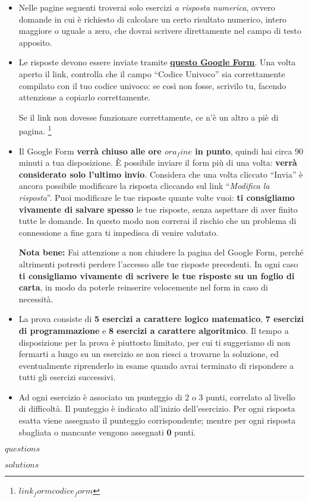 \documentclass[a4paper]{article}
\newcommand{\myul}[2][black]{\setulcolor{#1}\ul{\textbf{#2}}\setulcolor{black}}
\begin{document}
\begin{itemize}
    \item Nelle pagine seguenti troverai solo esercizi \emph{a risposta numerica},
          ovvero domande in cui è richiesto di calcolare un certo risultato
          numerico, intero maggiore o uguale a zero, che dovrai scrivere direttamente nel campo
          di testo apposito.

    \item Le risposte devono essere inviate tramite
          \href{${link_form}$${codice_form}$}{\color{blue}
          \myul[blue] {questo Google Form}}. Una volta aperto il link, controlla che
          il campo ``Codice Univoco'' sia correttamente compilato con il tuo codice
          univoco: se così non fosse, scrivilo tu,  facendo attenzione a copiarlo
          correttamente.

          Se il link non dovesse funzionare correttamente, ce n'è un altro a piè di pagina.%
          \footnote{\tiny\href{${link_form}$${codice_form}$}{\texttt{${link_form}$${codice_form}$}}}

    \item Il Google Form \textbf{verrà chiuso alle ore ${ora_fine}$ in punto}, quindi hai
          circa 90 minuti a tua disposizione. È possibile inviare il form più di una 
          volta: \textbf{verrà considerato solo l'ultimo invio}. Considera che una
          volta cliccato ``Invia'' è ancora possibile modificare la risposta cliccando
          sul link ``\emph{Modifica la risposta}''. Puoi modificare le tue risposte
          quante volte vuoi: \textbf{ti consigliamo vivamente di salvare spesso} le tue
          risposte, senza aspettare di aver finito tutte le domande. In questo modo non
          correrai il rischio che un problema di connessione a fine gara ti impedisca di
          venire valutato.

          \textbf{Nota bene:} Fai attenzione a non chiudere la pagina del Google Form,
          perché altrimenti potresti perdere l'accesso alle tue risposte precedenti.
          In ogni caso \textbf{ti consigliamo vivamente di scrivere le tue risposte su un
          foglio di carta}, in modo da poterle reinserire velocemente nel form in caso
          di necessità.

    \item La prova consiste di \textbf{5 esercizi a carattere logico
          matematico}, \textbf{7 esercizi di programmazione} e \textbf{8
          esercizi a carattere algoritmico}. Il tempo a disposizione per la
          prova è piuttosto limitato, per cui ti suggeriamo di non fermarti a lungo
          su un esercizio se non riesci a trovarne la soluzione, ed eventualmente
          riprenderlo in esame quando avrai terminato di rispondere a tutti gli esercizi
          successivi.

    \item Ad ogni esercizio è associato un punteggio di 2 o 3 punti, correlato al livello
          di difficoltà. Il punteggio è indicato all'inizio dell'esercizio. Per ogni risposta esatta
          viene assegnato il punteggio corrispondente; mentre per ogni risposta sbagliata
          o mancante vengono assegnati \textbf{0} punti.
\end{itemize}


${questions}$

${solutions}$
\end{document}
